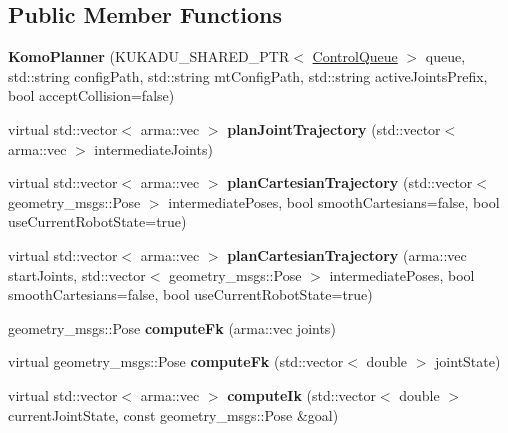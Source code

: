 \subsection*{Public Member Functions}
\begin{DoxyCompactItemize}
\item 
\hypertarget{classkukadu_1_1KomoPlanner_a4331523418d0c7d897b9cf27402d802d}{{\bfseries Komo\-Planner} (K\-U\-K\-A\-D\-U\-\_\-\-S\-H\-A\-R\-E\-D\-\_\-\-P\-T\-R$<$ \hyperlink{classkukadu_1_1ControlQueue}{Control\-Queue} $>$ queue, std\-::string config\-Path, std\-::string mt\-Config\-Path, std\-::string active\-Joints\-Prefix, bool accept\-Collision=false)}\label{classkukadu_1_1KomoPlanner_a4331523418d0c7d897b9cf27402d802d}

\item 
\hypertarget{classkukadu_1_1KomoPlanner_a4ae46be913930cca3fb9b50af46bf5f9}{virtual std\-::vector$<$ arma\-::vec $>$ {\bfseries plan\-Joint\-Trajectory} (std\-::vector$<$ arma\-::vec $>$ intermediate\-Joints)}\label{classkukadu_1_1KomoPlanner_a4ae46be913930cca3fb9b50af46bf5f9}

\item 
\hypertarget{classkukadu_1_1KomoPlanner_a709b980d12b45751d703f5eb2209d0e9}{virtual std\-::vector$<$ arma\-::vec $>$ {\bfseries plan\-Cartesian\-Trajectory} (std\-::vector$<$ geometry\-\_\-msgs\-::\-Pose $>$ intermediate\-Poses, bool smooth\-Cartesians=false, bool use\-Current\-Robot\-State=true)}\label{classkukadu_1_1KomoPlanner_a709b980d12b45751d703f5eb2209d0e9}

\item 
\hypertarget{classkukadu_1_1KomoPlanner_a10a2433bfb06c96d93d98c9b9cff075f}{virtual std\-::vector$<$ arma\-::vec $>$ {\bfseries plan\-Cartesian\-Trajectory} (arma\-::vec start\-Joints, std\-::vector$<$ geometry\-\_\-msgs\-::\-Pose $>$ intermediate\-Poses, bool smooth\-Cartesians=false, bool use\-Current\-Robot\-State=true)}\label{classkukadu_1_1KomoPlanner_a10a2433bfb06c96d93d98c9b9cff075f}

\item 
\hypertarget{classkukadu_1_1KomoPlanner_acea4864abb57deaa9007107b65c27198}{geometry\-\_\-msgs\-::\-Pose {\bfseries compute\-Fk} (arma\-::vec joints)}\label{classkukadu_1_1KomoPlanner_acea4864abb57deaa9007107b65c27198}

\item 
\hypertarget{classkukadu_1_1KomoPlanner_ab6272ef16fa277af8b517ef3f97da658}{virtual geometry\-\_\-msgs\-::\-Pose {\bfseries compute\-Fk} (std\-::vector$<$ double $>$ joint\-State)}\label{classkukadu_1_1KomoPlanner_ab6272ef16fa277af8b517ef3f97da658}

\item 
\hypertarget{classkukadu_1_1KomoPlanner_a87a2fbfd3652e6147366b2a312f26a4e}{virtual std\-::vector$<$ arma\-::vec $>$ {\bfseries compute\-Ik} (std\-::vector$<$ double $>$ current\-Joint\-State, const geometry\-\_\-msgs\-::\-Pose \&goal)}\label{classkukadu_1_1KomoPlanner_a87a2fbfd3652e6147366b2a312f26a4e}

\end{DoxyCompactItemize}
